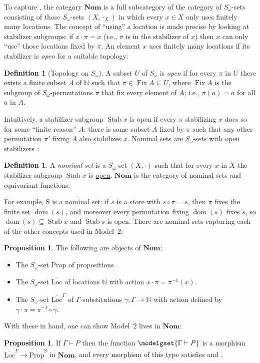 \documentclass[
  sigconf,
  screen, ]{acmart}
\makeatletter
\theoremstyle{definition}
\newtheorem{definition}[theorem]{Definition}
\newtheorem{proposition}[theorem]{Proposition}
\newcommand{\dom}{\operatorname{dom}}
\newcommand\N{\mathbb N}
\newcommand{\labelword}[2]{\phantomsection
  #1\def\@currentlabel{\unexpanded{#1}}\label{#2}}
\newcommand\nref[2]{\hyperref[#1]{#2}} \newcommand\checkhigh{{\huge{\color{red}\textbf{TODO: check}}}}
\newcommand\nomgrp{{\nref{def:nomgrp}{S_\omega}}}
\newcommand\Nom{{\nref{def:Nom}{\mathbf{Nom}}}}
\newcommand\nomLoc{{\nref{prop:warp-in-the-gsets}{\overline{\mathrm{Loc}}}}}
\newcommand\nomProp{{\nref{def:nomProp}{\overline{\mathrm{Prop}}}}}
\newcommand\nomStore{{\nref{def:nomStore}{\overline{\mathrm{S}}}}}
\newcommand\nomFix{\operatorname{\nref{def:nomFix}{Fix}}}
\newcommand\Stab{\operatorname{Stab}}
\makeatother
\begin{document}
To capture \Finiteness{}, the category $\Nom$
is a full subcategory of the category of $\nomgrp$-sets
consisting of those $\nomgrp$-sets $(X,\cdot_X)$
in which every $x\in X$ only uses finitely many locations.
The concept of ``using'' a location is made precise by looking at
stabilizer subgroups: if
$x\cdot\pi = x$
(i.e., $\pi$ is in the stabilizer of $x$)
then $x$ can only ``use'' those locations fixed by $\pi$.
An element $x$ uses finitely many locations if its stabilizer is \emph{open}
for a suitable topology:
\begin{definition}[Topology on $\nomgrp$] \label{def:open-stab}
  A subset $U$ of $\nomgrp$ is \emph{open}
  if for every $\pi$ in $U$
  there exists a finite subset $A$ of $\N$
  such that $\pi\in\nomFix A\subseteq U$,
  \labelword{where}{def:nomFix} $\nomFix A$
  is the subgroup of $\nomgrp$-permutations $\pi$
  that fix every element of $A$; i.e., $\pi(a) = a$ for all $a$ in $A$.
\end{definition}

Intuitively, a stabilizer subgroup $\Stab x$ is open
if every $\pi$ stabilizing $x$ does so for some ``finite reason'' $A$:
there is some subset $A$ fixed by $\pi$ such that any other permutation $\pi'$
fixing $A$ also stabilizes $x$.
Nominal sets are $\nomgrp$-sets with open stabilizers~\citep[\S 6.2]{pitts2003nominal}:

\begin{definition} \label{def:Nom}
  A \emph{nominal set}
  is a $\nomgrp$-set $(X,\cdot)$
  such that for every $x$ in $X$
  the stabilizer subgroup $\Stab x$ is \nref{def:open-stab}{open}.
  $\Nom$ is the category of nominal sets and equivariant functions.
\end{definition}

For example, $\nomStore$ is a nominal set:
if $s$ is a store with $s\circ\pi = s$,
then $\pi$ fixes the finite set $\dom(s)$,
and moreover every permutation fixing $\dom(s)$
fixes $s$, so $\dom(s)\subseteq\Stab x$ and $\Stab s$ is open.
There are nominal sets
capturing each
of the other concepts used in Model~2:
\begin{proposition} \label{prop:warp-in-the-gsets}
  The following are objects of $\Nom$:\begin{itemize}[leftmargin=*]
    \item The $\nomgrp$-set $\nomProp$ of propositions
    \item The $\nomgrp$-set $\nomLoc$ of locations $\N$
      with action $x\cdot \pi = \pi^{-1}(x)$.
    \item The $\nomgrp$-set $\nomLoc^\Gamma$ of $\Gamma$-substitutions
      $\gamma : \Gamma\to \N$
      with action defined by $\gamma\cdot \pi = \pi^{-1}\circ \gamma$.
  \end{itemize}
\end{proposition}
With these in hand, one can show Model~2 lives in $\Nom$:
\begin{proposition} \label{prop:model-two-lives-in-nom}
  If $\Gamma\vdash P$ then 
  the function
  $\modelgset{\Gamma\vdash P}$
  is a morphism $\nomLoc^\Gamma\to\nomProp^\nomStore$ in $\Nom$,
  and every morphism of this type
  satisfies \Permutation{} and \Finiteness{}.
\end{proposition}
\end{document}
